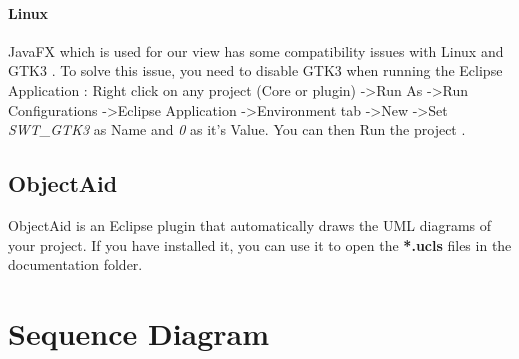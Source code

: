\documentclass{report}
\begin{document}
{\begin{enumerate}
\end{enumerate}

\subsubsection{Linux}
JavaFX which is used for our view has some compatibility issues with Linux and GTK3 . To solve this issue, you need to disable GTK3 when running the Eclipse Application : Right click on any project (Core or plugin) -\textgreater Run As -\textgreater Run Configurations -\textgreater Eclipse Application -\textgreater Environment tab -\textgreater New -\textgreater Set \textit{SWT\_GTK3} as Name and \textit{0} as it's Value. You can then Run the project .
}


\section{ObjectAid}
ObjectAid is an Eclipse plugin that automatically draws the UML diagrams of your project. If you have installed it, you can use it to open the \textbf{*.ucls} files in the documentation folder.

\chapter{Sequence Diagram}
\end{document}
